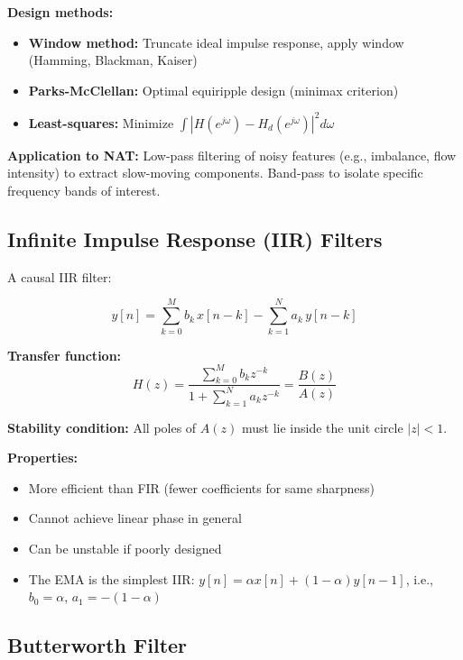 \documentclass[11pt,a4paper]{article}
\begin{document}
\textbf{Design methods:}
\begin{itemize}
    \item \textbf{Window method:} Truncate ideal impulse response, apply window (Hamming, Blackman, Kaiser)
    \item \textbf{Parks-McClellan:} Optimal equiripple design (minimax criterion)
    \item \textbf{Least-squares:} Minimize $\int |H(e^{j\omega}) - H_d(e^{j\omega})|^2 d\omega$
\end{itemize}

\textbf{Application to NAT:} Low-pass filtering of noisy features (e.g., imbalance, flow intensity) to extract slow-moving components. Band-pass to isolate specific frequency bands of interest.

\subsection{Infinite Impulse Response (IIR) Filters}

A causal IIR filter:

\begin{equation}
y[n] = \sum_{k=0}^{M} b_k \, x[n-k] - \sum_{k=1}^{N} a_k \, y[n-k]
\end{equation}

\textbf{Transfer function:}
\begin{equation}
H(z) = \frac{\sum_{k=0}^{M} b_k z^{-k}}{1 + \sum_{k=1}^{N} a_k z^{-k}} = \frac{B(z)}{A(z)}
\end{equation}

\textbf{Stability condition:} All poles of $A(z)$ must lie inside the unit circle $|z| < 1$.

\textbf{Properties:}
\begin{itemize}
    \item More efficient than FIR (fewer coefficients for same sharpness)
    \item Cannot achieve linear phase in general
    \item Can be unstable if poorly designed
    \item The EMA is the simplest IIR: $y[n] = \alpha x[n] + (1-\alpha) y[n-1]$, i.e., $b_0 = \alpha$, $a_1 = -(1-\alpha)$
\end{itemize}

\subsection{Butterworth Filter}
\end{document}
